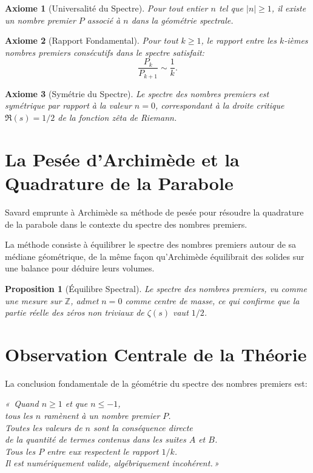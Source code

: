 \documentclass[12pt,a4paper]{article}
\newtheorem{proposition}{Proposition}
\newtheorem{axiome}{Axiome}
\begin{document}
\begin{axiome}[Universalité du Spectre]
Pour tout entier $n$ tel que $|n| \geq 1$, il existe un nombre premier $P$ associé
à $n$ dans la géométrie spectrale.
\end{axiome}

\begin{axiome}[Rapport Fondamental]
Pour tout $k \geq 1$, le rapport entre les $k$-ièmes nombres premiers consécutifs
dans le spectre satisfait:
\[
  \frac{P_k}{P_{k+1}} \sim \frac{1}{k}.
\]
\end{axiome}

\begin{axiome}[Symétrie du Spectre]
Le spectre des nombres premiers est symétrique par rapport à la valeur $n = 0$,
correspondant à la droite critique $\Re(s) = 1/2$ de la fonction zêta de Riemann.
\end{axiome}

\section{La Pesée d'Archimède et la Quadrature de la Parabole}

Savard emprunte à Archimède sa méthode de pesée pour résoudre la quadrature de la
parabole dans le contexte du spectre des nombres premiers.

La méthode consiste à équilibrer le spectre des nombres premiers autour de sa
médiane géométrique, de la même façon qu'Archimède équilibrait des solides sur
une balance pour déduire leurs volumes.

\begin{proposition}[Équilibre Spectral]
Le spectre des nombres premiers, vu comme une mesure sur $\mathbb{Z}$, admet
$n = 0$ comme centre de masse, ce qui confirme que la partie réelle des zéros non
triviaux de $\zeta(s)$ vaut $1/2$.
\end{proposition}

\section{Observation Centrale de la Théorie}

La conclusion fondamentale de la géométrie du spectre des nombres premiers est:

\begin{center}
\textit{«\, Quand $n \geq 1$ et que $n \leq -1$,\\
tous les $n$ ramènent à un nombre premier $P$.\\
Toutes les valeurs de $n$ sont la conséquence directe\\
de la quantité de termes contenus dans les suites $A$ et $B$.\\
Tous les $P$ entre eux respectent le rapport $1/k$.\\
Il est numériquement valide, algébriquement incohérent.\,»}
\end{center}
\end{document}
